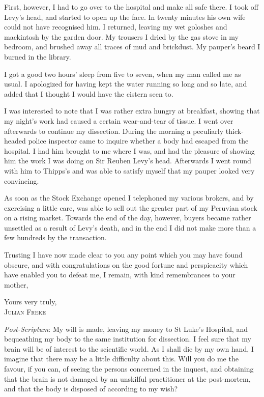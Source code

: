 First, however, I had to go over to the hospital and make all safe there. I took off Levy's head, and started to open up the face. In twenty minutes his own wife could not have recognised him. I returned, leaving my wet goloshes and mackintosh by the garden door. My trousers I dried by the gas stove in my bedroom, and brushed away all traces of mud and brickdust. My pauper's beard I burned in the library.

I got a good two hours' sleep from five to seven, when my man called me as usual. I apologized for having kept the water running so long and so late, and added that I thought I would have the cistern seen to.

I was interested to note that I was rather extra hungry at breakfast, showing that my night's work had caused a certain wear-and-tear of tissue. I went over afterwards to continue my dissection. During the morning a peculiarly thick-headed police inspector came to inquire whether a body had escaped from the hospital. I had him brought to me where I was, and had the pleasure of showing him the work I was doing on Sir Reuben Levy's head. Afterwards I went round with him to Thipps's and was able to satisfy myself that my pauper looked very convincing.

As soon as the Stock Exchange opened I telephoned my various brokers, and by exercising a little care, was able to sell out the greater part of my Peruvian stock on a rising market. Towards the end of the day, however, buyers became rather unsettled as a result of Levy's death, and in the end I did not make more than a few hundreds by the transaction.

Trusting I have now made clear to you any point which you may have found obscure, and with congratulations on the good fortune and perspicacity which have enabled you to defeat me, I remain, with kind remembrances to your mother,

\begin{flushright}
Yours very truly,\\
\textsc{Julian Freke}
\end{flushright}

\textit{Post-Scriptum}: My will is made, leaving my money to St Luke's Hospital, and bequeathing my body to the same institution for dissection. I feel sure that my brain will be of interest to the scientific world. As I shall die by my own hand, I imagine that there may be a little difficulty about this. Will you do me the favour, if you can, of seeing the persons concerned in the inquest, and obtaining that the brain is not damaged by an unskilful practitioner at the post-mortem, and that the body is disposed of according to my wish?

